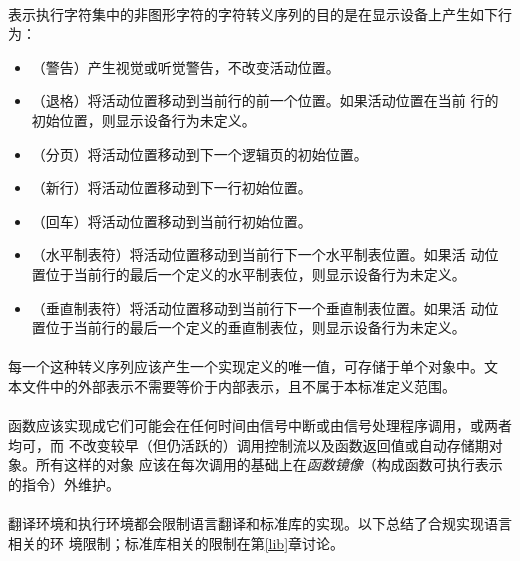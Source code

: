 \paragraph{}
表示执行字符集中的非图形字符的字符转义序列的目的是在显示设备上产生如下行为：
\begin{itemize}
  \item{（警告）产生视觉或听觉警告，不改变活动位置。}
  \item{（退格）将活动位置移动到当前行的前一个位置。如果活动位置在当前
    行的初始位置，则显示设备行为未定义。}
  \item{（分页）将活动位置移动到下一个逻辑页的初始位置。}
  \item{（新行）将活动位置移动到下一行初始位置。}
  \item{（回车）将活动位置移动到当前行初始位置。}
  \item{（水平制表符）将活动位置移动到当前行下一个水平制表位置。如果活
    动位置位于当前行的最后一个定义的水平制表位，则显示设备行为未定义。}
  \item{（垂直制表符）将活动位置移动到当前行下一个垂直制表位置。如果活
    动位置位于当前行的最后一个定义的垂直制表位，则显示设备行为未定义。}
\end{itemize}

\paragraph{}
每一个这种转义序列应该产生一个实现定义的唯一值，可存储于单个对象中。文
本文件中的外部表示不需要等价于内部表示，且不属于本标准定义范围。


\paragraph{}
函数应该实现成它们可能会在任何时间由信号中断或由信号处理程序调用，或两者均可，而
不改变较早（但仍活跃的）调用控制流以及函数返回值或自动存储期对象。所有这样的对象
应该在每次调用的基础上在\textit{函数镜像}（构成函数可执行表示的指令）外维护。

\paragraph{}
翻译环境和执行环境都会限制语言翻译和标准库的实现。以下总结了合规实现语言相关的环
境限制；标准库相关的限制在第\ref{lib}章讨论。

